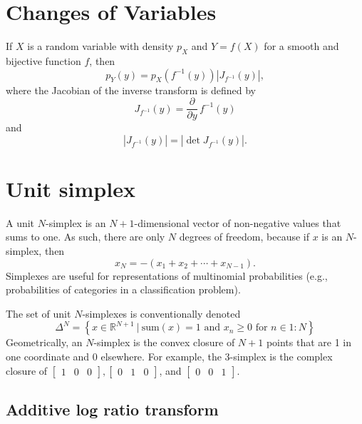 \documentclass[11pt]{article}
\newcommand{\setcomp}[2]{\left\{ #1 \ \Big|\ #2 \right\}}
\newcommand{\rngto}[1]{1{:}#1}
\newcommand{\abs}[1]{\left| #1 \right|}
\newcommand{\absdet}[1]{\abs{#1}}
\begin{document}
\section{Changes of Variables}

If $X$ is a random variable with density $p_X$ and $Y = f(X)$ for a
smooth and bijective function $f$, then
\[
  p_Y(y) = p_X(f^{-1}(y)) \absdet{J_{f^{-1}}(y)},
\]
where the Jacobian of the inverse transform is defined by
\[
  J_{f^{-1}}(y) = \frac{\partial}{\partial y} \, f^{-1}(y)
\]
and
\[
  \absdet{J_{f^{-1}}(y)}
  = \abs{\det J_{f^{-1}}(y)}.
\]



\section{Unit simplex}

A unit $N$-simplex is an $N + 1$-dimensional vector of non-negative
values that sums to one.  As such, there are only $N$ degrees of
freedom, because if $x$ is an $N$-simplex, then
\[
  x_N = -(x_1 + x_2 + \cdots + x_{N-1}).
\]
Simplexes are useful for representations of multinomial probabilities
(e.g., probabilities of categories in a classification problem).

The set of unit $N$-simplexes is conventionally denoted
\[
  \Delta^N = \setcomp{x \in \mathbb{R}^{N + 1}}{\textrm{sum}(x) = 1
    \textrm{ and }
    x_n \geq 0 \textrm{ for } n \in \rngto{N}}
\]
Geometrically, an $N$-simplex is the convex closure of $N+1$ points
that are 1 in one coordinate and 0 elsewhere.  For example, the
3-simplex is the complex closure of
$\begin{bmatrix}1 & 0 & 0 \end{bmatrix},
\begin{bmatrix} 0 & 1 & 0 \end{bmatrix}$,
and $\begin{bmatrix} 0 & 0 & 1 \end{bmatrix}$.


\subsection{Additive log ratio transform}
\end{document}
